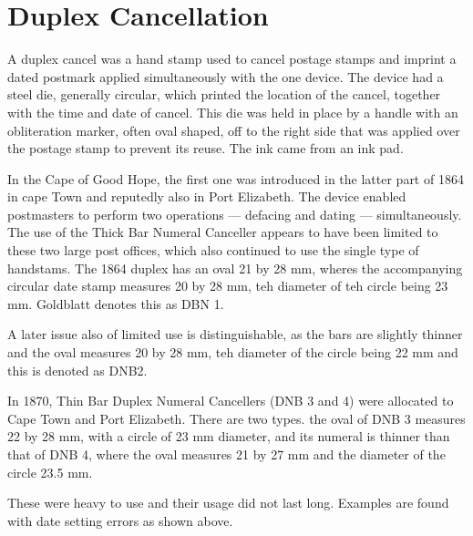 \chapter{Duplex Cancellation}

A duplex cancel was a hand stamp used to cancel postage stamps and imprint a dated postmark applied simultaneously with the one device. The device had a steel die, generally circular, which printed the location of the cancel, together with the time and date of cancel. This die was held in place by a handle with an obliteration marker, often oval shaped, off to the right side that was applied over the postage stamp to prevent its reuse. The ink came from an ink pad.

In the Cape of Good Hope, the first one was introduced in the latter part of 1864 in cape Town and reputedly also in Port Elizabeth. The device enabled postmasters to perform two operations --- defacing and dating --- simultaneously. The use of the Thick Bar Numeral Canceller appears to have been limited to these two large post offices, which also continued to use the single type of handstams. The 1864 duplex has an oval 21 by 28 mm, wheres the accompanying circular date stamp measures 20 by 28 mm, teh diameter of teh circle being 23 mm. Goldblatt denotes this as DBN 1. 

A later issue also of limited use is distinguishable, as the bars are slightly thinner and the oval measures 20 by 28 mm, teh diameter of the circle being 22 mm and this is denoted as DNB2.


In 1870, Thin Bar Duplex Numeral Cancellers (DNB 3 and 4) were allocated to Cape Town and Port Elizabeth. There are two types. the oval of DNB 3 measures 22 by 28 mm, with a circle of 23 mm diameter, and its numeral is thinner than that of DNB 4, where the oval measures 21 by 27 mm and the diameter of the circle 23.5 mm.


These were heavy to use and their usage did not last long. Examples are found with date setting errors as shown above.